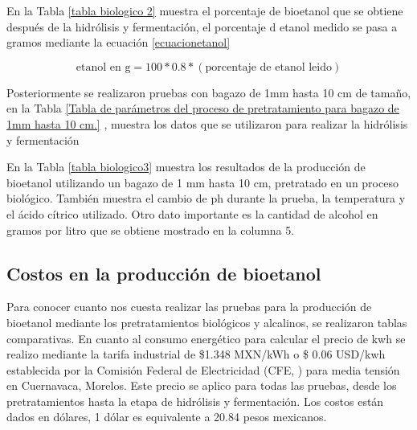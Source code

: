 \documentclass[12pt]{article}
\begin{document}
 	En la Tabla \ref{tabla biologico 2} muestra el porcentaje de bioetanol que se obtiene después de la hidrólisis y fermentación, el porcentaje d etanol medido se pasa a gramos mediante la ecuación \ref{ecuacionetanol}
 	
 	\begin{equation}
 		\label{ecuacionetanol}
 		\text{etanol en g}= 100* 0.8 *( \text{porcentaje de etanol leido})
 	\end{equation}
 	
 	Posteriormente se realizaron pruebas con bagazo de 1mm hasta 10 cm de tamaño, en la Tabla 	\ref{Tabla de parámetros del proceso de pretratamiento para bagazo de 1mm hasta 10 cm.} , muestra los datos que se utilizaron para realizar la hidrólisis y fermentación 
 	
 	
 	En la Tabla 	\ref{tabla biologico3} muestra los resultados de la producción de bioetanol utilizando un bagazo de 1 mm hasta 10 cm, pretratado en un proceso biológico. También muestra el cambio de ph durante la prueba, la temperatura y el ácido cítrico utilizado. Otro dato importante es la cantidad de alcohol en gramos por litro que se obtiene mostrado en la columna 5.
 	
 

 	
		
			
			\subsection{Costos en la producción de bioetanol}
	Para conocer cuanto nos cuesta realizar las pruebas para la producción de bioetanol mediante los pretratamientos biológicos y alcalinos, se realizaron tablas comparativas.
	En cuanto al consumo energético para calcular el precio de kwh se realizo mediante la tarifa industrial de \$1.348 MXN/kWh o \$ 0.06 USD/kwh establecida por la Comisión Federal de Electricidad (CFE, \cite{CFE2023}) para media tensión en Cuernavaca, Morelos. Este precio se aplico para todas las pruebas, desde los pretratamientos hasta la etapa de hidrólisis y fermentación. Los costos están dados en dólares, 1 dólar es equivalente a 20.84 pesos mexicanos.
			
\end{document}
